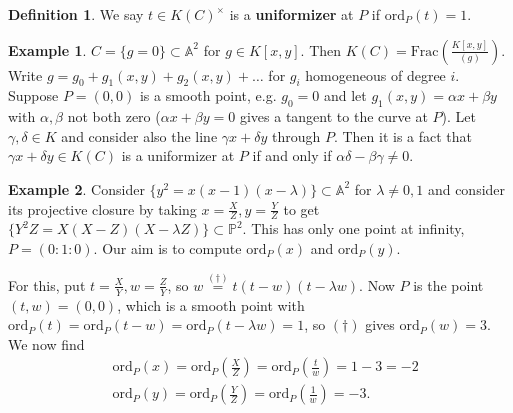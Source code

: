 \documentclass{article}
\theoremstyle{definition}
\newtheorem{example}{Example}[section]
\newtheorem{defn}{Definition}[section]
\begin{document}
\begin{defn}
    We say $t \in K(C)^\times$ is a \textbf{uniformizer} at $P$ if $\text{ord}_P(t)=1$.
\end{defn}
\begin{example}
    $C =\{g = 0\} \subset \mathbb{A}^2$ for $g \in K[x,y]$. Then $K(C) = \text{Frac}\left(\frac{K[x,y]}{(g)}\right)$. Write $g = g_0+g_1(x,y) + g_2(x,y) + \ldots$ for $g_i$ homogeneous of degree $i$. Suppose $P = (0,0)$ is a smooth point, e.g. $g_0=0$ and let $g_1(x,y)=\alpha x + \beta y$ with $\alpha,\beta$ not both zero ($\alpha x + \beta y =0$ gives a tangent to the curve at $P$). Let $\gamma,\delta \in K$ and consider also the line $\gamma x + \delta y$ through $P$. Then it is a fact that $\gamma x + \delta y \in K(C)$ is a uniformizer at $P$ if and only if $\alpha \delta - \beta \gamma \neq 0$. 
\end{example}
\begin{example}\label{ex2.3}
    Consider $\{y^2 = x(x-1)(x-\lambda)\} \subset \mathbb{A}^2$ for $\lambda \neq 0,1$ and consider its projective closure by taking $x =\frac{X}{Z}, y = \frac{Y}{Z}$ to get $\{Y^2Z = X(X-Z)(X-\lambda Z)\} \subset \mathbb{P}^2$. This has only one point at infinity, $P = (0 : 1 : 0)$. Our aim is to compute $\text{ord}_P(x)$ and $\text{ord}_P(y)$.
    \vspace{1mm}
     
    For this, put $t = \frac{X}{Y}, w =\frac{Z}{Y}$, so $w \stackrel{(\dagger)}{=}  t(t-w)(t-\lambda w) $. Now $P$ is the point $(t,w) = (0,0)$, which is a smooth point with $\text{ord}_P(t) = \text{ord}_P(t-w) = \text{ord}_P(t-\lambda w) = 1$, so $(\dagger)$ gives $\text{ord}_P(w) = 3$. We now find
    \begin{align*}
        &\text{ord}_P(x) = \text{ord}_P\left(\frac{X}{Z}\right) = \text{ord}_P\left(\frac{t}{w}\right) = 1-3 = -2\\
        &\text{ord}_P(y) = \text{ord}_P\left(\frac{Y}{Z}\right) = \text{ord}_P\left(\frac{1}{w}\right) = -3.
    \end{align*}
\end{example}
\end{document}
